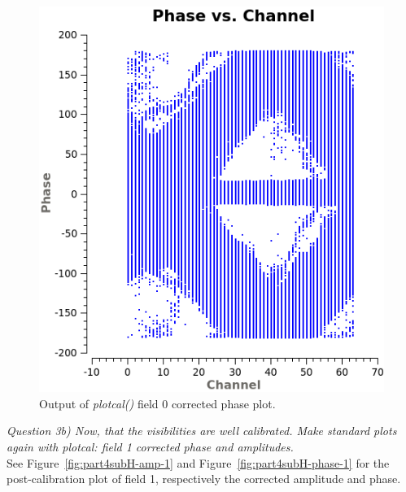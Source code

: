 \documentclass[12pt, a4paper]{article}
\begin{document}
\begin{figure}[h!]
    \centering
    \includegraphics[scale=0.5]{../Imaging/plots/part4-subH-question3_fld0-corrected-phase.png}
    \caption{Output of \emph{plotcal()} field 0 corrected phase plot. \label{fig:part4subH-phase-0}}
\end{figure}
\newpage
\noindent \textit{Question 3b) Now, that the visibilities are well calibrated. Make standard plots again with plotcal: field 1 corrected phase and amplitudes.} \\
See Figure~\ref{fig:part4subH-amp-1} and Figure~\ref{fig:part4subH-phase-1} for the post-calibration plot of field 1, respectively the corrected amplitude and phase. \\
\newpage
\end{document}
